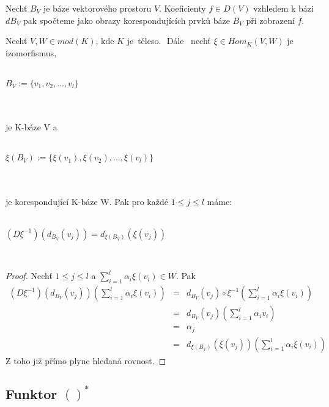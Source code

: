      \begin{dsl}
       Nechť $B_V$ je báze vektorového prostoru $V$.
       Koeficienty $f\in D(V)$ vzhledem k bázi $dB_V$ pak spočteme 
       jako obrazy korespondujících prvků báze $B_V$ při zobrazení $f$.
     \end{dsl}
         
     \begin{lem}\label{lem-baze-dual-xi}
       Nechť $V,W\in mod(K)$, kde $K$ je\, těleso.\,\, Dále \, nechť $\xi \in Hom_K(V,W)$ 
       je izomorfismus,  \\\\
       \centerline{$B_V:=\{v_1,v_2,\ldots,v_l\}$}\\\\
       je K-báze V a  \\\\
       \centerline{$\xi(B_V):=\{\xi(v_1),\xi(v_2),\ldots,\xi(v_l)\}$}\\\\
       je korespondující K-báze W. Pak pro každé $1\leq j \leq l$ máme: \\\\
       \centerline{$(D\xi^{-1})(d_{B_V}(v_j))=d_{\xi(B_V)}(\xi(v_j))$}\\
     \end{lem}
     \begin{proof}
       Nechť $1\leq j \leq l$ a $\sum_{i=1}^l\alpha_i\xi(v_i)\in W$. Pak
       \begin{eqnarray}
         (D\xi^{-1})(d_{B_V}(v_j)) \left( \sum_{i=1}^l\alpha_i\xi(v_i) \right)
         &=& d_{B_V}(v_j) \circ \xi^{-1} \left( \sum_{i=1}^l\alpha_i\xi(v_i) \right) \nonumber \\      
         &=& d_{B_V}(v_j) \left( \sum_{i=1}^l\alpha_i v_i \right) \nonumber \\      
         &=& \alpha_j \nonumber \\      
         &=& d_{\xi(B_V)}(\xi(v_j)) \left( \sum_{i=1}^l\alpha_i\xi(v_i) \right) \nonumber        
       \end{eqnarray}
       Z toho již přímo plyne hledaná rovnost.
     \end{proof}
     
   \subsection{Funktor $()^*$}
     
